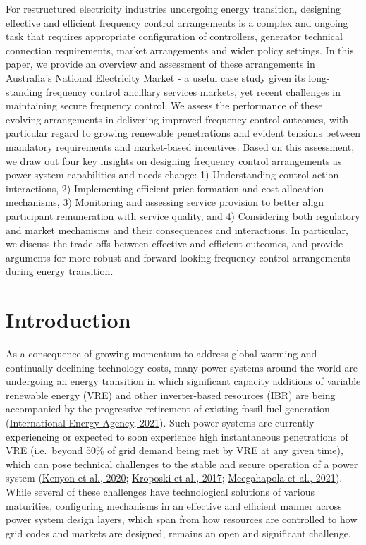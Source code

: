 \documentclass[12pt,a4paper,]{report}
\begin{document}
For restructured electricity industries undergoing energy transition,
designing effective and efficient frequency control arrangements is a
complex and ongoing task that requires appropriate configuration of
controllers, generator technical connection requirements, market
arrangements and wider policy settings. In this paper, we provide an
overview and assessment of these arrangements in Australia's National
Electricity Market - a useful case study given its long-standing
frequency control ancillary services markets, yet recent challenges in
maintaining secure frequency control. We assess the performance of these
evolving arrangements in delivering improved frequency control outcomes,
with particular regard to growing renewable penetrations and evident
tensions between mandatory requirements and market-based incentives.
Based on this assessment, we draw out four key insights on designing
frequency control arrangements as power system capabilities and needs
change: 1) Understanding control action interactions, 2) Implementing
efficient price formation and cost-allocation mechanisms, 3) Monitoring
and assessing service provision to better align participant remuneration
with service quality, and 4) Considering both regulatory and market
mechanisms and their consequences and interactions. In particular, we
discuss the trade-offs between effective and efficient outcomes, and
provide arguments for more robust and forward-looking frequency control
arrangements during energy transition.

\hypertarget{sec:fcs-intro}{%
\section{Introduction}\label{sec:fcs-intro}}

As a consequence of growing momentum to address global warming and
continually declining technology costs, many power systems around the
world are undergoing an energy transition in which significant capacity
additions of variable renewable energy (VRE) and other inverter-based
resources (IBR) are being accompanied by the progressive retirement of
existing fossil fuel generation
(\protect\hyperlink{ref-internationalenergyagencyNetZero20502021}{International
Energy Agency, 2021}). Such power systems are currently experiencing or
expected to soon experience high instantaneous penetrations of VRE
(i.e.~beyond 50\% of grid demand being met by VRE at any given time),
which can pose technical challenges to the stable and secure operation
of a power system
(\protect\hyperlink{ref-kenyonStabilityControlPower2020}{Kenyon et al.,
2020};
\protect\hyperlink{ref-kroposkiAchieving100Renewable2017}{Kroposki et
al., 2017};
\protect\hyperlink{ref-meegahapolaPowerSystemStability2021}{Meegahapola
et al., 2021}). While several of these challenges have technological
solutions of various maturities, configuring mechanisms in an effective
and efficient manner across power system design layers, which span from
how resources are controlled to how grid codes and markets are designed,
remains an open and significant challenge.
\end{document}
